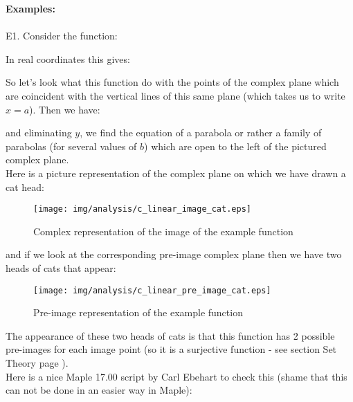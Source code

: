 	\begin{tcolorbox}[colframe=black,colback=white,sharp corners,breakable]
	\textbf{{\Large {}}Examples:}\\\\
	E1. Consider the function:
	
	In real coordinates this gives:
		
	So let's look what this function do with the points of the complex plane which are coincident with the vertical lines of this same plane (which takes us to write $x=a$). Then we have:
	
	and eliminating $y$, we find the equation of a parabola or rather a family of  parabolas (for several values of $b$) which are open to the left of the pictured complex plane.\\

	Here is a picture representation of the complex plane on which we have drawn a cat head:
	\begin{figure}[H]
		\begin{center}
			\texttt{[image: img/analysis/c\_linear\_image\_cat.eps]}
		\end{center}	
		\caption[]{Complex representation of the image of the example function}
	\end{figure}
	and if we look at the corresponding pre-image complex plane then we have two heads of cats that appear:
	\begin{figure}[H]
		\begin{center}
			\texttt{[image: img/analysis/c\_linear\_pre\_image\_cat.eps]}
		\end{center}	
		\caption[]{Pre-image representation of the example function}
	\end{figure}
	The appearance of these two heads of cats is that this function has 2 possible pre-images for each image point (so it is a surjective function - see section Set Theory page \pageref{surjective application}).\\

	Here is a nice Maple 17.00 script by Carl Ebehart to check this (shame that this can not be done in an easier way in Maple):\\


\end{tcolorbox}
